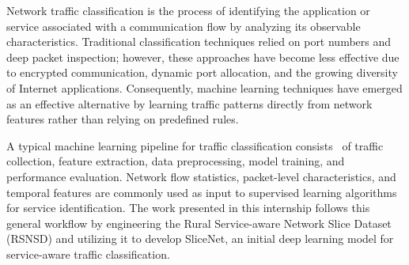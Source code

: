 \documentclass[12pt,a4paper]{report}
\begin{document}
	Network traffic classification is the process of identifying the application or service associated with a communication flow by analyzing its observable characteristics. Traditional classification techniques relied on port numbers and deep packet inspection; however, these approaches have become less effective due to encrypted communication, dynamic port allocation, and the growing diversity of Internet applications. Consequently, machine learning techniques have emerged as an effective alternative by learning traffic patterns directly from network features rather than relying on predefined rules.
	
	A typical machine learning pipeline for traffic classification consists~\cite{nguyen2008survey, pacheco2018machine, wang2015end} of traffic collection, feature extraction, data preprocessing, model training, and performance evaluation. Network flow statistics, packet-level characteristics, and temporal features are commonly used as input to supervised learning algorithms for service identification. The work presented in this internship follows this general workflow by engineering the Rural Service-aware Network Slice Dataset (RSNSD) and utilizing it to develop SliceNet, an initial deep learning model for service-aware traffic classification.
	

	
\end{document}
